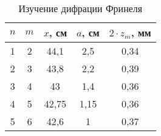 \begin{table}[h!]
\centering
\begin{tabular}{|c|c|c|c|c|}
\hline
$n$ & $m$ & $x$, см & $a$, см & $2 \cdot z_m$, мм  \\ \hline
1   & 2   & 44,1    & 2,5     & 0,34               \\ \hline
2   & 3   & 43,8    & 2,2     & 0,39               \\ \hline
3   & 4   & 43      & 1,4     & 0,36               \\ \hline
4   & 5   & 42,75   & 1,15    & 0,36               \\ \hline
5   & 6   & 42,6    & 1       & 0,37               \\ \hline
\end{tabular}
\caption{Изучение дифрации Фринеля}
\label{tab:Finel}
\end{table}
